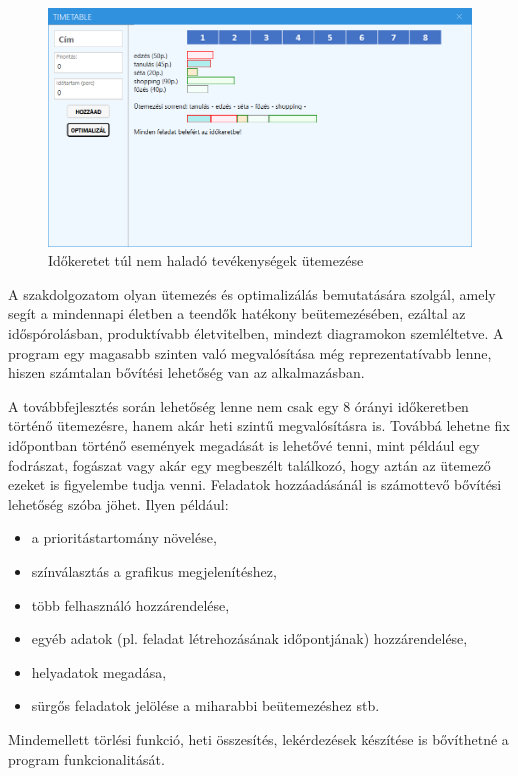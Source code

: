 \begin{figure}[h]
	\centering
	\includegraphics[scale=0.6]{images/test/result2.png}
	\caption{Időkeretet túl nem haladó tevékenységek ütemezése}
\end{figure}


A szakdolgozatom olyan ütemezés és optimalizálás bemutatására szolgál, amely segít a mindennapi életben a teendők hatékony beütemezésében, ezáltal az időspórolásban, produktívabb életvitelben, mindezt diagramokon szemléltetve. A program egy magasabb szinten való megvalósítása még reprezentatívabb lenne, hiszen számtalan bővítési lehetőség van az alkalmazásban.

A továbbfejlesztés során lehetőség lenne nem csak egy 8 órányi időkeretben történő ütemezésre, hanem akár heti szintű megvalósításra is. Továbbá lehetne fix időpontban történő események megadását is lehetővé tenni, mint például egy fodrászat, fogászat vagy akár egy megbeszélt találkozó, hogy aztán az ütemező ezeket is figyelembe tudja venni.
Feladatok hozzáadásánál is számottevő bővítési lehetőség szóba jöhet. Ilyen például:

\begin{itemize}
\item a prioritástartomány növelése,
\item színválasztás a grafikus megjelenítéshez,
\item több felhasználó hozzárendelése,
\item egyéb adatok (pl. feladat létrehozásának időpontjának) hozzárendelése,
\item helyadatok megadása,
\item sürgős feladatok jelölése a miharabbi beütemezéshez stb.
\end{itemize}

Mindemellett törlési funkció, heti összesítés, lekérdezések készítése is bővíthetné a program funkcionalitását.
